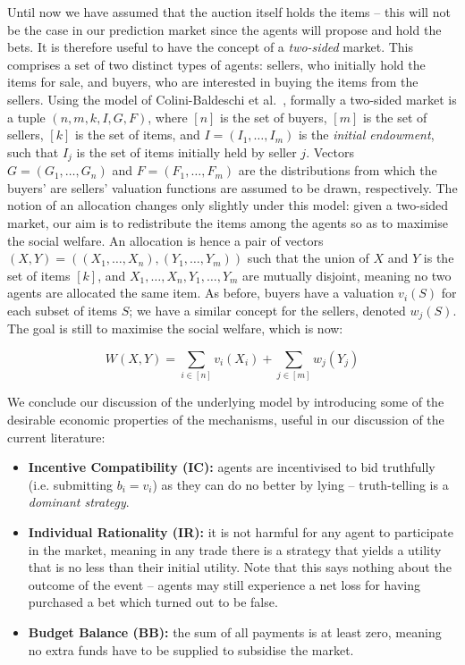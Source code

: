 \documentclass[10pt,a4paper]{article}
\theoremstyle{plain}
\theoremstyle{definition}
\begin{document}
	Until now we have assumed that the auction itself holds the items --
	this will not be the case in our prediction market since the agents will
	propose and hold the bets. It is therefore useful to have the concept of a
	\emph{two-sided} market. This comprises a set of two distinct types of
	agents: sellers, who initially hold the items for sale, and buyers, who are
	interested in buying the items from the sellers. Using the model of
	Colini-Baldeschi et al.~\cite{ColiniBaldeschi2017}, formally a two-sided
	market is a tuple $(n, m, k, I, G, F)$, where $[n]$ is the set of buyers,
	$[m]$ is the set of sellers, $[k]$ is the set of items, and $I = (I_1,
	\ldots, I_m)$ is the \emph{initial endowment}, such that $I_j$ is the set
	of items initially held by seller $j$. Vectors $G = (G_1, \ldots, G_n)$ and
	$F = (F_1, \ldots, F_m)$ are the distributions from which the buyers' are
	sellers' valuation functions are assumed to be drawn, respectively. The
	notion of an allocation changes only slightly under this model: given a
	two-sided market, our aim is to redistribute the items among the agents so
	as to maximise the social welfare. An allocation is hence a pair of vectors
	$(X,Y) = ((X_1, \ldots, X_n), (Y_1, \ldots, Y_m))$ such that the union of
	$X$ and $Y$ is the set of items $[k]$, and $X_1, \ldots, X_n, Y_1, \ldots,
	Y_m$ are mutually disjoint, meaning no two agents are allocated the same
	item. As before, buyers have a valuation $v_i(S)$ for each subset of items
	$S$; we have a similar concept for the sellers,	denoted $w_j(S)$. The goal
	is still to maximise the social welfare, which is now:

	\begin{equation*}
		W(X, Y) = \sum_{i \in [n]} v_i(X_i) + \sum_{j \in [m]} w_j(Y_j)
	\end{equation*}

	We conclude our discussion of the underlying model by introducing some of
	the desirable economic properties of the mechanisms, useful in our
	discussion of the current literature:

	\begin{itemize}
		\itemsep0em
		\item \textbf{Incentive Compatibility (IC):} agents are incentivised to
			bid truthfully (i.e. submitting $b_i = v_i$) as they can do no
			better by lying -- truth-telling is a \emph{dominant strategy}.

		\item \textbf{Individual Rationality (IR):} it is not harmful for any
			agent to participate in the market, meaning in any trade there is a
			strategy that yields a utility that is no less than their initial
			utility. Note that this says nothing about the outcome of the event
			-- agents may still experience a net loss for having purchased a
			bet which turned out to be false.

		\item \textbf{Budget Balance (BB):} the sum of all payments is at least
			zero, meaning no extra funds have to be supplied to subsidise the
			market.

	\end{itemize}
\end{document}
